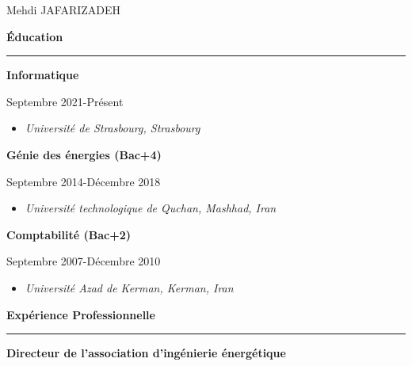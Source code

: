\documentclass[a4paper]{letter}
\newcommand{\divider}{\rule{\linewidth}{0.9pt}}
\begin{document}
\begin{minipage}[t]{0.60\textwidth}


\setlength{\baselineskip}{1.5\baselineskip}
\vspace{0.7cm}

{\huge Mehdi JAFARIZADEH}

\vspace{1cm}


{\large \textbf{Éducation}}
\divider


{\textbf{Informatique}}

{\footnotesize Septembre 2021-Présent}
\begin{itemize}
    \footnotesize \item \textit{Université de Strasbourg, Strasbourg}
\end{itemize}

\vspace{3mm}

{ \textbf{Génie des énergies (Bac+4)}}

{\footnotesize Septembre 2014-Décembre 2018}
\begin{itemize}
    \footnotesize \item \textit{Université technologique de Quchan, Mashhad, Iran}
\end{itemize}

\vspace{3mm}

{ \textbf{Comptabilité (Bac+2)}}

{\footnotesize Septembre 2007-Décembre 2010}
\begin{itemize}
    \footnotesize \item \textit{Université Azad de Kerman, Kerman, Iran}
\end{itemize}



\vspace{0.8cm}


{\large \textbf{Expérience Professionnelle}}
\divider

{\textbf{Directeur de l'association d'ingénierie énergétique}}


\end{minipage}
\end{document}
